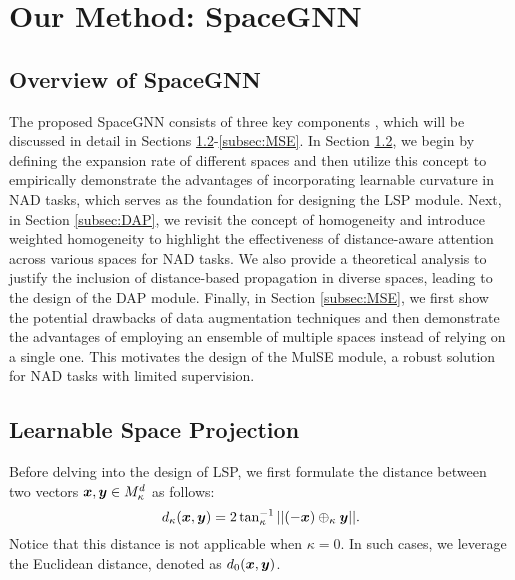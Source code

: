 \section{Our Method: SpaceGNN}
\label{sec:method}


\subsection{Overview of SpaceGNN}
\label{subsec:overview}

The proposed SpaceGNN consists of three key components%
, which will be discussed in detail in Sections \ref{subsec:LSP}-\ref{subsec:MSE}. In Section \ref{subsec:LSP}, we begin by defining the expansion rate of different spaces and then utilize this concept to empirically demonstrate the advantages of incorporating learnable curvature in NAD tasks, which serves as the foundation for designing the LSP module. Next, in Section \ref{subsec:DAP}, we revisit the concept of homogeneity and introduce weighted homogeneity to highlight the effectiveness of distance-aware attention across various spaces for NAD tasks. We also provide a theoretical analysis to justify the inclusion of distance-based propagation in diverse spaces, leading to the design of the DAP module. Finally, in Section \ref{subsec:MSE}, we first show the potential drawbacks of data augmentation techniques and then demonstrate the advantages of employing an ensemble of multiple spaces instead of relying on a single one. This motivates the design of the {\update MulSE} module, a robust solution for NAD tasks with limited supervision. 

%

\subsection{Learnable Space Projection}
\label{subsec:LSP}

Before delving into the design of LSP, we first formulate the distance between two vectors $\boldsymbol{x}, \boldsymbol{y}\in M_\kappa^d$ as follows: 
\begin{equation}\label{eqn:distancek}
    d_\kappa(\boldsymbol{x}, \boldsymbol{y})=2\tan_\kappa^{-1}||(-\boldsymbol{x})\oplus_\kappa\boldsymbol{y}||. 
\end{equation}
Notice that this distance is not applicable when $\kappa=0$. In such cases, we leverage the Euclidean distance, denoted as $d_0(\boldsymbol{x}, \boldsymbol{y})$. 

